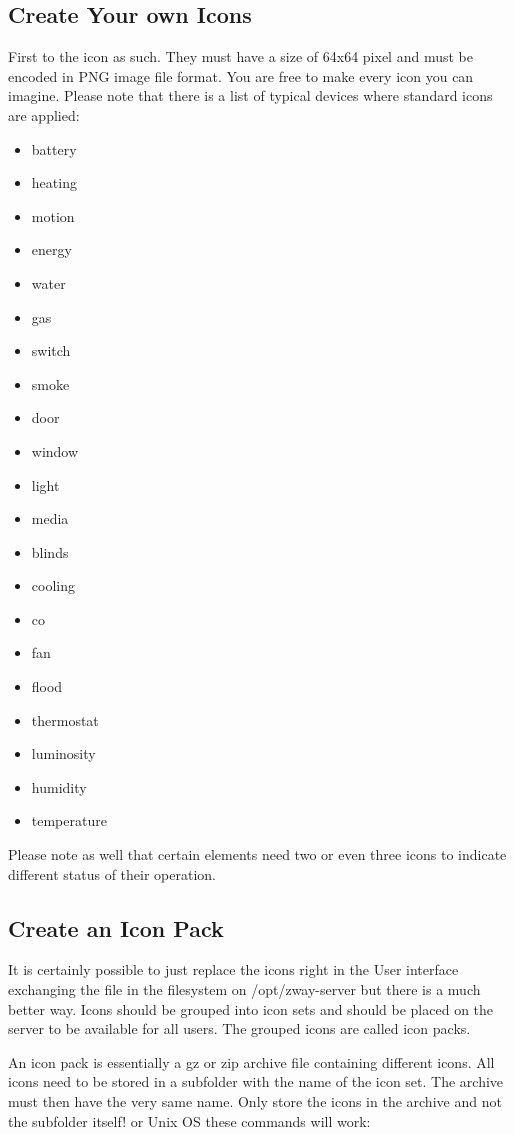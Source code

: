 \subsection{Create Your own Icons}

First to the icon as such. They must have a size of 64x64 pixel and must be encoded in PNG 
image file format. You are free to make every icon you can imagine. Please note that 
there is a list of typical devices where standard icons are applied:

\begin{itemize}
\item battery
\item heating
\item motion
\item energy
\item water
\item gas
\item switch
\item smoke
\item door
\item window
\item light
\item media
\item blinds
\item cooling
\item co
\item fan
\item flood
\item thermostat
\item luminosity
\item humidity
\item temperature

\end{itemize}

Please note as well that certain elements need two or even three icons to indicate 
different status of their operation.


\subsection{Create an Icon Pack}

It is certainly possible to just replace the icons right in the User interface exchanging 
the file in the filesystem on /opt/zway-server but there is a much better way. Icons 
should be grouped into icon sets and should be placed on the server to be available 
for all \zway users.
The grouped icons are called icon packs.

An icon pack is essentially a gz or zip archive file containing different icons. All 
icons need to be stored in a subfolder with the name of the icon set. The archive must 
then have the very same name.
Only store the icons in the archive and not the subfolder itself!
or Unix OS these commands will work:

